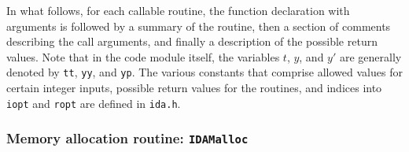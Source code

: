 In what follows, for each callable routine, the function declaration
with arguments is followed by a summary of the routine, then a section
of comments describing the call arguments, and finally a description
of the possible return values.  Note that in the code module itself,
the variables $t$, $y$, and $y'$ are generally denoted by {\tt tt},
{\tt yy}, and {\tt yp}.  The various constants that comprise allowed
values for certain integer inputs, possible return values for the
routines, and indices into {\tt iopt} and {\tt ropt} are defined in
{\tt ida.h}.

\newpage

\subsubsection{Memory allocation routine: {\tt IDAMalloc}}

